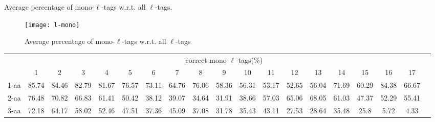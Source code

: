 \documentclass{article}[12pt]
\begin{document}
\begin{landscape}
\begin{table}[h]
\caption{ Average percentage of mono-$\ell$-tags w.r.t. all $\ell$-tags.}
\label{table:l-mono}

\vspace{3mm}
\end{table}
\end{landscape}

\begin{figure}
  \begin{center}
\texttt{[image: l-mono]}
\end{center}
\caption{Average percentage of mono-$\ell$-tags w.r.t. all $\ell$-tags}
  \label{fig:l-mono}
\end{figure}


\begin{landscape}

\begin{table}[h]\tiny
\vspace{3mm}
{\centering
\begin{center}
\begin{tabular}{|l|c|c|c|c|c|c|c|c|c|c|c|c|c|c|c|c|c|c|}
  \hline
  & \multicolumn{ 17 }{|c|}{correct mono-$\ell$-tags(\%)} \\
  \cline{2- 18}
    & 1 & 2 & 3 & 4 & 5 & 6 & 7 & 8 & 9 & 10 & 11 & 12 & 13 & 14 & 15 & 16 & 17\\
  \hline
1-aa  & 85.74 & 84.46 & 82.79 & 81.67 & 76.57 & 73.11 & 64.76 & 76.06 & 58.36 & 56.31 & 53.17 & 52.65 & 56.04 & 71.69 & 60.29 & 84.38 & 66.67\\
2-aa  & 76.48 & 70.82 & 66.83 & 61.41 & 50.42 & 38.12 & 39.07 & 34.64 & 31.91 & 38.66 & 57.03 & 65.06 & 68.05 & 61.03 & 47.37 & 52.29 & 55.41\\
3-aa  & 72.18 & 64.17 & 58.02 & 52.46 & 47.51 & 37.36 & 45.09 & 37.08 & 31.78 & 35.43 & 43.11 & 27.53 & 28.64 & 35.48 & 25.8 & 5.72 & 4.33\\
 \hline
\end{tabular}
\end{center}
\par}
\centering


\end{table}
\end{landscape}
\end{document}
